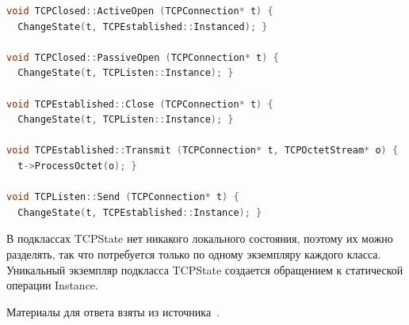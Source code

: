 \begin{lstlisting}[language=c++,caption=Примеры реализаций методов подклассов TCPState,label=lst:TCPState_subclasses_realization]
void TCPClosed::ActiveOpen (TCPConnection* t) {
  ChangeState(t, TCPEstablished::Instanced); }

void TCPClosed::PassiveOpen (TCPConnection* t) {
  ChangeState(t, TCPListen::Instance); }

void TCPEstablished::Close (TCPConnection* t) {
  ChangeState(t, TCPListen::Instance); }

void TCPEstablished::Transmit (TCPConnection* t, TCPOctetStream* o) {
  t->ProcessOctet(o); }

void TCPListen::Send (TCPConnection* t) { 
  ChangeState(t, TCPEstablished::Instance); }
\end{lstlisting}

В подклассах TCPState нет никакого локального состояния, поэтому их можно
 разделять, так что потребуется только по одному экземпляру каждого класса.
Уникальный экземпляр подкласса TCPState создается обращением к статической
операции Instance.

Материалы для ответа взяты из источника~\cite{gamma01}.